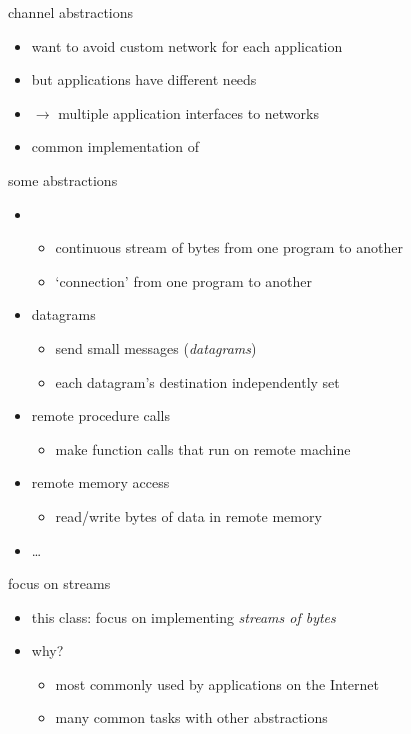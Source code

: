 \begin{frame}{channel abstractions}
\begin{itemize}
    \item want to avoid custom network for each application
    \item but applications have different needs
    \vspace{.5cm}
    \item $\rightarrow$ multiple application interfaces to networks
    \item common implementation of 
\end{itemize}
\end{frame}

\begin{frame}{some abstractions}
    \begin{itemize}
    \item {}
        \begin{itemize}
        \item continuous stream of bytes from one program to another
        \item `connection' from one program to another
        \end{itemize}
    \item datagrams
        \begin{itemize}
        \item send small messages (\textit{datagrams})
        \item each datagram's destination independently set
        \end{itemize}
    \item remote procedure calls
        \begin{itemize}
        \item make function calls that run on remote machine
        \end{itemize}
    \item remote memory access
        \begin{itemize}
        \item read/write bytes of data in remote memory
        \end{itemize}
    \item \ldots
    \end{itemize}
\end{frame}

\begin{frame}{focus on streams}
    \begin{itemize}
    \item this class: focus on implementing \textit{streams of bytes}
    \vspace{.5cm}
    \item why?
        \begin{itemize}
        \item most commonly used by applications on the Internet
        \item many common tasks with other abstractions
        \end{itemize}
    \end{itemize}
\end{frame}
